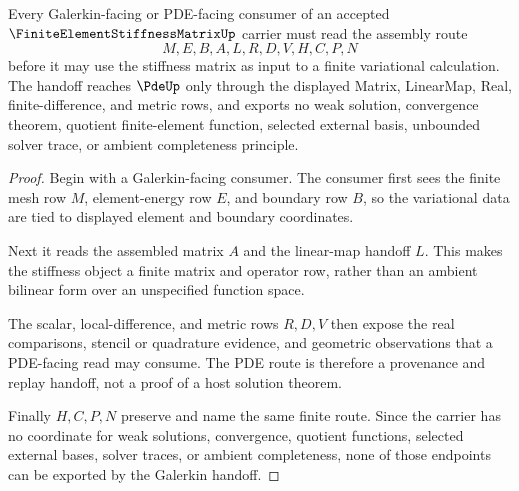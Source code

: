 \begin{theorem}
\label{thm:finite-element-stiffness-matrix-galerkin-handoff}
Every Galerkin-facing or PDE-facing consumer of an accepted $\FiniteElementStiffnessMatrixUp$ carrier must read the assembly route
$$
M,E,B,A,L,R,D,V,H,C,P,N
$$
before it may use the stiffness matrix as input to a finite variational calculation. The handoff reaches $\PdeUp$ only through the displayed Matrix, LinearMap, Real, finite-difference, and metric rows, and exports no weak solution, convergence theorem, quotient finite-element function, selected external basis, unbounded solver trace, or ambient completeness principle.
\end{theorem}
\begin{proof}
Begin with a Galerkin-facing consumer. The consumer first sees the finite mesh row $M$, element-energy row $E$, and boundary row $B$, so the variational data are tied to displayed element and boundary coordinates.

Next it reads the assembled matrix $A$ and the linear-map handoff $L$. This makes the stiffness object a finite matrix and operator row, rather than an ambient bilinear form over an unspecified function space.

The scalar, local-difference, and metric rows $R,D,V$ then expose the real comparisons, stencil or quadrature evidence, and geometric observations that a PDE-facing read may consume. The PDE route is therefore a provenance and replay handoff, not a proof of a host solution theorem.

Finally $H,C,P,N$ preserve and name the same finite route. Since the carrier has no coordinate for weak solutions, convergence, quotient functions, selected external bases, solver traces, or ambient completeness, none of those endpoints can be exported by the Galerkin handoff.
\end{proof}


